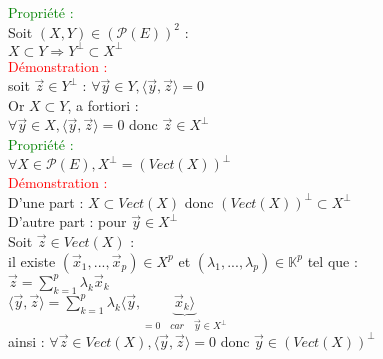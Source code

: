 \documentclass{article}
\begin{document}
\textcolor{green}{Propriété :} \\
Soit $(X,Y) \in (\mathcal P(E))^2$ : \\
$X \subset Y \Rightarrow Y^{\perp} \subset X^{\perp}$ \\
\textcolor{red}{Démonstration :} \\
soit $\vec z \in Y^{\perp}$ : $\forall \vec y \in Y, \langle \vec y, \vec z \rangle =0$ \\
Or $X \subset Y$, a fortiori : \\
$\forall \vec y \in X, \langle \vec y, \vec z \rangle=0$ donc $\vec z \in X^{\perp}$ \\
 \textcolor{green}{Propriété :} \\
 $\forall X \in \mathcal P(E), X^{\perp}=(Vect(X))^{\perp}$ \\
 \textcolor{red}{Démonstration :} \\
 D'une part : $X\subset Vect(X)$ donc $(Vect(X))^{\perp} \subset X^{\perp}$ \\
 D'autre part : pour $\vec y \in X^{\perp}$ \\
 Soit $\vec z \in Vect(X)$ : \\
 il existe $(\vec x_1,...,\vec x_p) \in X^p$ et $(\lambda_1,...,\lambda_p) \in \mathbb K^p$ tel que : \\
 $\vec z= \sum_{k=1}^p \lambda_k \vec x_k$ \\
 $\langle \vec y, \vec z \rangle = \sum_{k=1}^p \lambda_k \langle \vec y, \underbrace{\vec x_k \rangle}_{=0 \quad car \quad \vec y \in X^{\perp}}$ \\
 ainsi : $\forall \vec z \in Vect(X), \langle \vec y, \vec z \rangle =0$ donc $\vec y \in (Vect(X))^{\perp}$
\end{document}
